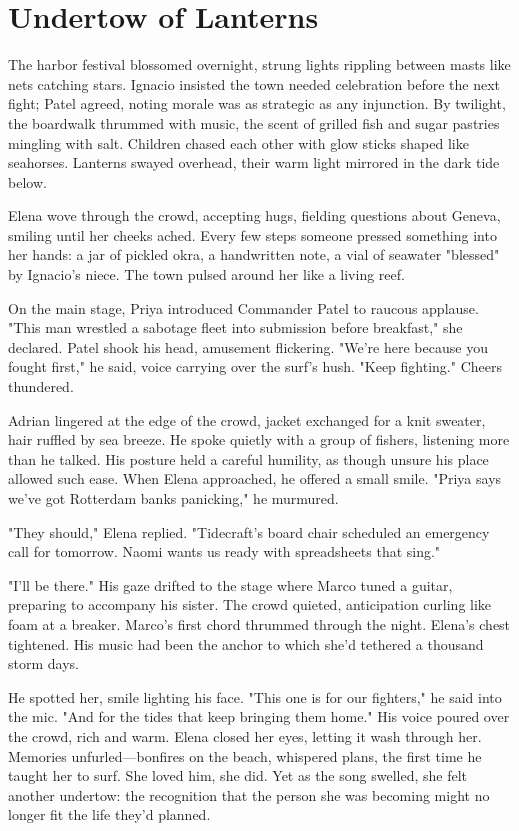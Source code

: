 \chapter{Undertow of Lanterns}

The harbor festival blossomed overnight, strung lights rippling between masts like nets catching stars. Ignacio insisted the town needed celebration before the next fight; Patel agreed, noting morale was as strategic as any injunction. By twilight, the boardwalk thrummed with music, the scent of grilled fish and sugar pastries mingling with salt. Children chased each other with glow sticks shaped like seahorses. Lanterns swayed overhead, their warm light mirrored in the dark tide below.

Elena wove through the crowd, accepting hugs, fielding questions about Geneva, smiling until her cheeks ached. Every few steps someone pressed something into her hands: a jar of pickled okra, a handwritten note, a vial of seawater "blessed" by Ignacio's niece. The town pulsed around her like a living reef.

On the main stage, Priya introduced Commander Patel to raucous applause. "This man wrestled a sabotage fleet into submission before breakfast," she declared. Patel shook his head, amusement flickering. "We're here because you fought first," he said, voice carrying over the surf's hush. "Keep fighting." Cheers thundered.

Adrian lingered at the edge of the crowd, jacket exchanged for a knit sweater, hair ruffled by sea breeze. He spoke quietly with a group of fishers, listening more than he talked. His posture held a careful humility, as though unsure his place allowed such ease. When Elena approached, he offered a small smile. "Priya says we've got Rotterdam banks panicking," he murmured.

"They should," Elena replied. "Tidecraft's board chair scheduled an emergency call for tomorrow. Naomi wants us ready with spreadsheets that sing."

"I'll be there." His gaze drifted to the stage where Marco tuned a guitar, preparing to accompany his sister. The crowd quieted, anticipation curling like foam at a breaker. Marco's first chord thrummed through the night. Elena's chest tightened. His music had been the anchor to which she'd tethered a thousand storm days.

He spotted her, smile lighting his face. "This one is for our fighters," he said into the mic. "And for the tides that keep bringing them home." His voice poured over the crowd, rich and warm. Elena closed her eyes, letting it wash through her. Memories unfurled—bonfires on the beach, whispered plans, the first time he taught her to surf. She loved him, she did. Yet as the song swelled, she felt another undertow: the recognition that the person she was becoming might no longer fit the life they'd planned.

